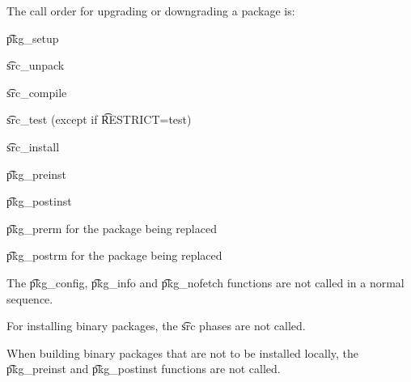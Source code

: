 The call order for upgrading or downgrading a package is:

\begin{compactitem}
\item \t{pkg\_setup}
\item \t{src\_unpack}
\item \t{src\_compile}
\item \t{src\_test} (except if \t{RESTRICT=test})
\item \t{src\_install}
\item \t{pkg\_preinst}
\item \t{pkg\_postinst}
\item \t{pkg\_prerm} for the package being replaced
\item \t{pkg\_postrm} for the package being replaced
\end{compactitem}

The \t{pkg\_config}, \t{pkg\_info} and \t{pkg\_nofetch} functions are not called in a normal
sequence.

For installing binary packages, the \t{src} phases are not called.

When building binary packages that are not to be installed locally, the \t{pkg\_preinst}
and \t{pkg\_postinst} functions are not called.


